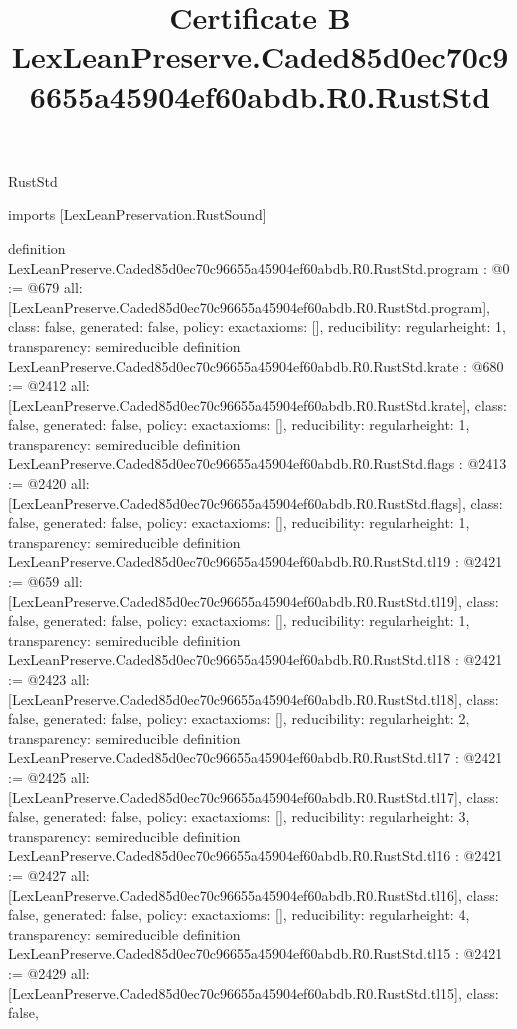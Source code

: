 \begin{lexlean}{RustStd}
\title{Certificate B LexLeanPreserve.Caded85d0ec70c96655a45904ef60abdb.R0.RustStd}
\begin{coremodule}
imports [LexLeanPreservation.RustSound]

definition LexLeanPreserve.Caded85d0ec70c96655a45904ef60abdb.R0.RustStd.program : @0 := @679 {
  all: [LexLeanPreserve.Caded85d0ec70c96655a45904ef60abdb.R0.RustStd.program],
  class: false,
  generated: false,
  policy: exact{axioms: []},
  reducibility: regular{height: 1},
  transparency: semireducible
}
definition LexLeanPreserve.Caded85d0ec70c96655a45904ef60abdb.R0.RustStd.krate : @680 := @2412 {
  all: [LexLeanPreserve.Caded85d0ec70c96655a45904ef60abdb.R0.RustStd.krate],
  class: false,
  generated: false,
  policy: exact{axioms: []},
  reducibility: regular{height: 1},
  transparency: semireducible
}
definition LexLeanPreserve.Caded85d0ec70c96655a45904ef60abdb.R0.RustStd.flags : @2413 := @2420 {
  all: [LexLeanPreserve.Caded85d0ec70c96655a45904ef60abdb.R0.RustStd.flags],
  class: false,
  generated: false,
  policy: exact{axioms: []},
  reducibility: regular{height: 1},
  transparency: semireducible
}
definition LexLeanPreserve.Caded85d0ec70c96655a45904ef60abdb.R0.RustStd.tl19 : @2421 := @659 {
  all: [LexLeanPreserve.Caded85d0ec70c96655a45904ef60abdb.R0.RustStd.tl19],
  class: false,
  generated: false,
  policy: exact{axioms: []},
  reducibility: regular{height: 1},
  transparency: semireducible
}
definition LexLeanPreserve.Caded85d0ec70c96655a45904ef60abdb.R0.RustStd.tl18 : @2421 := @2423 {
  all: [LexLeanPreserve.Caded85d0ec70c96655a45904ef60abdb.R0.RustStd.tl18],
  class: false,
  generated: false,
  policy: exact{axioms: []},
  reducibility: regular{height: 2},
  transparency: semireducible
}
definition LexLeanPreserve.Caded85d0ec70c96655a45904ef60abdb.R0.RustStd.tl17 : @2421 := @2425 {
  all: [LexLeanPreserve.Caded85d0ec70c96655a45904ef60abdb.R0.RustStd.tl17],
  class: false,
  generated: false,
  policy: exact{axioms: []},
  reducibility: regular{height: 3},
  transparency: semireducible
}
definition LexLeanPreserve.Caded85d0ec70c96655a45904ef60abdb.R0.RustStd.tl16 : @2421 := @2427 {
  all: [LexLeanPreserve.Caded85d0ec70c96655a45904ef60abdb.R0.RustStd.tl16],
  class: false,
  generated: false,
  policy: exact{axioms: []},
  reducibility: regular{height: 4},
  transparency: semireducible
}
definition LexLeanPreserve.Caded85d0ec70c96655a45904ef60abdb.R0.RustStd.tl15 : @2421 := @2429 {
  all: [LexLeanPreserve.Caded85d0ec70c96655a45904ef60abdb.R0.RustStd.tl15],
  class: false,
}
\end{coremodule}
\end{lexlean}
